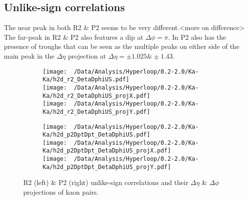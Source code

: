 \documentclass[12pt,a4paper,twoside]{report}
\begin{document}
\subsection{Unlike-sign correlations}
The near peak in both R2 \& P2 seems to be very different.<more on difference> The far-peak in R2 \& P2 also features a dip at $\Delta\phi=\pi$. In P2 also has the presence of troughs that can be seen as the multiple peaks on either side of the main peak in the $\Delta\eta$ projection at $\Delta\eta=\pm1.025\&\pm1.43$.
\begin{figure}[H]
	\begin{subfigure}{0.49\linewidth}
		\texttt{[image: ~/Data/Analysis/Hyperloop/0.2-2.0/Ka-Ka/h2d\_r2\_DetaDphiUS.pdf]}\\
		\texttt{[image: ~/Data/Analysis/Hyperloop/0.2-2.0/Ka-Ka/h2d\_r2\_DetaDphiUS\_projX.pdf]}\\
		\texttt{[image: ~/Data/Analysis/Hyperloop/0.2-2.0/Ka-Ka/h2d\_r2\_DetaDphiUS\_projY.pdf]}\\
	\end{subfigure}
	\begin{subfigure}{0.49\linewidth}
		\texttt{[image: ~/Data/Analysis/Hyperloop/0.2-2.0/Ka-Ka/h2d\_p2DptDpt\_DetaDphiUS.pdf]}\\
		\texttt{[image: ~/Data/Analysis/Hyperloop/0.2-2.0/Ka-Ka/h2d\_p2DptDpt\_DetaDphiUS\_projX.pdf]}\\
		\texttt{[image: ~/Data/Analysis/Hyperloop/0.2-2.0/Ka-Ka/h2d\_p2DptDpt\_DetaDphiUS\_projY.pdf]}\\
	\end{subfigure}
	\caption{R2 (left) \& P2 (right) unlike-sign correlations and their $\Delta\eta$ \& $\Delta\phi$ projections of kaon pairs.}
\end{figure}
\end{document}
